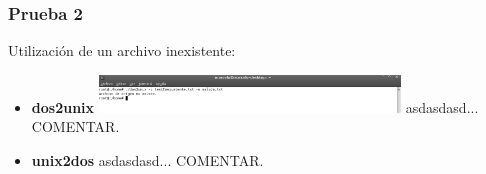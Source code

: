 \documentclass[a4paper,10pt]{article}
\begin{document}
    \subsubsection{Prueba 2}
    Utilizaci\'on de un archivo inexistente:
      \begin{itemize}
      \item \textbf{dos2unix}
      \newline
      \includegraphics[width=8cm, viewport=0 0 1168 147]{../Informe/Imagenes/prueba2-archivo-dos2unix.png}
      \newline	
      asdasdasd... COMENTAR.
      \item \textbf{unix2dos}
      \newline
      asdasdasd... COMENTAR.
      \end{itemize}
\end{document}
